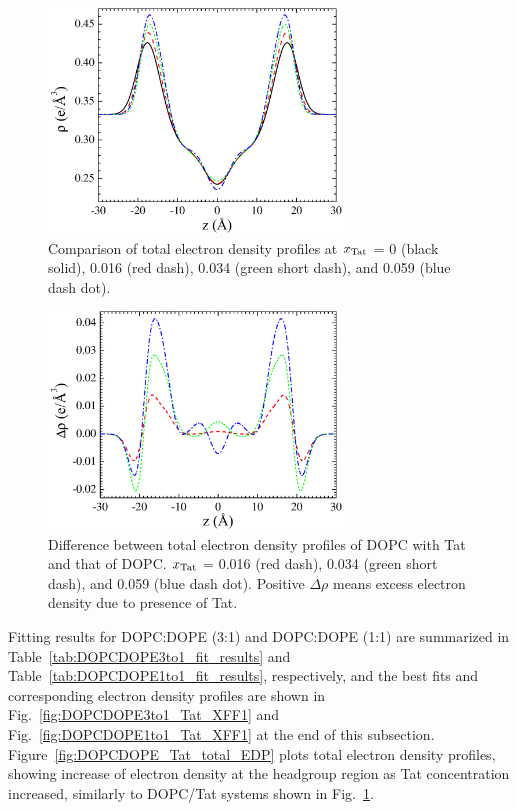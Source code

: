\begin{figure}[htbp]
  \centering
  \includegraphics[width=0.7\textwidth]{figures/Tat/SDP_Results/EDP/DOPC_Tat_total_EDP}
  \caption[]{Comparison of total electron density profiles at $x_\textrm{Tat}$ = 0 (black solid),
  0.016 (red dash), 0.034 (green short dash), and 0.059 (blue dash dot).}
  \label{fig:DOPC_Tat_total_EDP}
\end{figure}

\begin{figure}[htbp]
  \centering
  \includegraphics[width=0.7\textwidth]{figures/Tat/SDP_Results/EDP/DOPC_Tat_total_EDP_diff}
  \caption[Difference between total electron density profiles of DOPC with Tat 
  and that of DOPC]{Difference between total electron density profiles of DOPC with Tat 
  and that of DOPC. $x_\textrm{Tat}$ = 0.016 (red dash), 0.034 (green short dash), 
  and 0.059 (blue dash dot). Positive $\Delta\rho$ means excess electron density 
  due to presence of Tat.}
  \label{fig:DOPC_Tat_total_EDP_difference}
\end{figure}

Fitting results for DOPC:DOPE (3:1) and DOPC:DOPE (1:1) are summarized 
in Table~\ref{tab:DOPCDOPE3to1_fit_results} and 
Table~\ref{tab:DOPCDOPE1to1_fit_results}, respectively,
and the best fits and corresponding electron density profiles are shown in 
Fig.~\ref{fig:DOPCDOPE3to1_Tat_XFF1} and Fig.~\ref{fig:DOPCDOPE1to1_Tat_XFF1}
at the end of this subsection. 
Figure~\ref{fig:DOPCDOPE_Tat_total_EDP} plots total electron density profiles,
showing increase of electron density at the headgroup region as Tat concentration
increased, similarly to DOPC/Tat systems shown in Fig.~\ref{fig:DOPC_Tat_total_EDP}.

